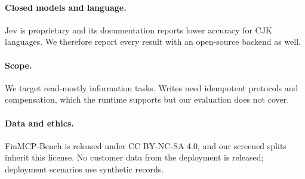 \paragraph{Closed models and language.} Jev is proprietary and its documentation reports lower accuracy for CJK languages. We therefore report every result with an open-source backend as well.

\paragraph{Scope.} We target read-mostly information tasks. Writes need idempotent protocols and compensation, which the runtime supports but our evaluation does not cover.

\paragraph{Data and ethics.} FinMCP-Bench is released under CC BY-NC-SA 4.0, and our screened splits inherit this license. No customer data from the deployment is released; deployment scenarios use synthetic records. 
